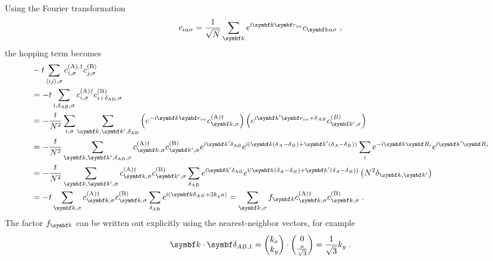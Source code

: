 \documentclass[../notes.tex]{subfiles}
\begin{document}
Using the Fourier transformation
\begin{equation}
	c_{i \alpha \sigma} = \frac{1}{\sqrt{N}} \sum_{\vb{k}} e^{\iu \vb{k} \vb{r}_{i \alpha}} c_{\vb{k} \alpha \sigma} \;,
\end{equation}
the hopping term becomes
\begin{align}
	&-t \sum_{\langle ij \rangle, \sigma} c_{i, \sigma}^{(\mathrm{A}), \dagger} c_{j, \sigma}^{(\mathrm{B})} \\
	&= -t \sum_{i,\delta_{\mathrm{AB}},\sigma} c_{i, \sigma}^{(\mathrm{A}) \dagger} c_{i + \delta_{\mathrm{AB}}, \sigma}^{(\mathrm{B})} \\
	&= -\frac{t}{N^2} \sum_{i,\sigma} \sum_{\vb{k}, \vb{k}^{\prime}, \delta_{\mathrm{AB}}} \left(e^{-\iu \vb{k} \vb{r}_{i \alpha}} c_{\vb{k}, \sigma}^{(\mathrm{A}) \dagger}\right) \left(e^{\iu \vb{k}^{\prime} \vb{r}_{i \alpha} +\delta_{AB}} c_{\vb{k}^{\prime}, \sigma}^{(B)} \right) \\
	&= -\frac{t}{N^2} \sum_{\vb{k}, \vb{k^{\prime}}, \delta_{\mathrm{AB}}, \sigma} c_{\vb{k}, \sigma}^{(\mathrm{A}) \dagger} c_{\vb{k}^{\prime}, \sigma}^{(\mathrm{B})} e^{\iu \vb{k}^{\prime} \delta_{\mathrm{AB}}} e^{\iu (\vb{k} (\delta_A - \delta_B) + \vb{k}^{\prime} (\delta_A - \delta_B))} \sum_{i} e^{-\iu \vb{k} \vb{R}_i} e^{\iu \vb{k}^{\prime} \vb{R}_i} \\
	&= -\frac{t}{N^2} \sum_{\vb{k}, \vb{k^{\prime}}, \sigma}  c_{\vb{k}, \sigma}^{(\mathrm{A}) \dagger} c_{\vb{k}^{\prime}, \sigma}^{(\mathrm{B})} \sum_{\delta_{\mathrm{AB}}} e^{\iu \vb{k}^{\prime} \delta_{\mathrm{AB}}} e^{\iu (\vb{k} (\delta_A - \delta_B) + \vb{k}^{\prime} (\delta_A - \delta_B))} \left(N^2 \delta_{\vb{k}, \vb{k}^{\prime}} \right)\\
	&= -t \sum_{\vb{k}, \sigma}  c_{\vb{k}, \sigma}^{(\mathrm{A}) \dagger} c_{\vb{k}, \sigma}^{(\mathrm{B})} \sum_{\delta_{\mathrm{AB}}} e^{\iu (\vb{k} \delta_{AB} + 2 k_y a)} = \sum_{\vb{k}, \sigma} f_{\vb{k}} c_{\vb{k}, \sigma}^{(\mathrm{A}) \dagger} c_{\vb{k}, \sigma}^{(\mathrm{B})} \;.
\end{align}
The factor \(f_{\vb{k}}\) can be written out explicitly using the nearest-neighbor vectors, for example
\begin{align}
	\vb{k} \cdot \vb{\delta_{AB, 1}} = \begin{pmatrix} k_x \\ k_y \end{pmatrix} \cdot \begin{pmatrix} 0 \\ \frac{a}{\sqrt{3}} \end{pmatrix} = \frac{1}{\sqrt{3}} k_y \;.
\end{align}
\end{document}

